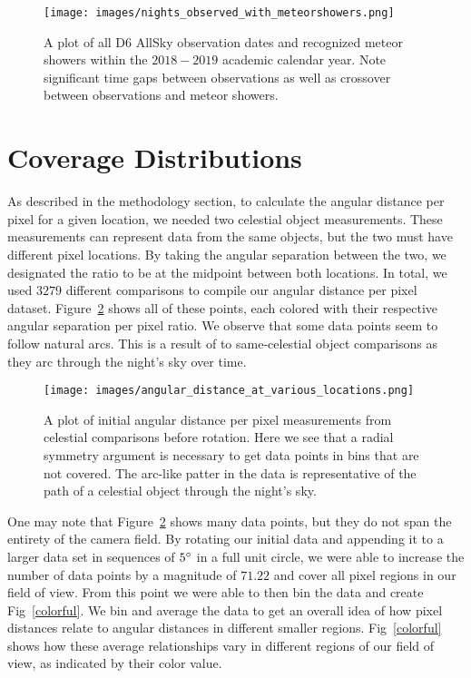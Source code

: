 \begin{figure}[ht!]
  \centering
  \texttt{[image: images/nights\_observed\_with\_meteorshowers.png]}
  \caption[A plot of all D6 AllSky observation dates and recognized meteor showers within the $2018-2019$ academic calendar year.]{A plot of all D6 AllSky observation dates and recognized meteor showers within the $2018-2019$ academic calendar year.  Note significant time gaps between observations as well as crossover between observations and meteor showers.}
  \label{dateplot}
\end{figure}




\section{Coverage Distributions}

As described in the methodology section, to calculate the angular distance per pixel for a given location, we needed two celestial object measurements.
These measurements can represent data from the same objects, but the two must have different pixel locations.
By taking the angular separation between the two, we designated the ratio to be at the midpoint between both locations.  
In total, we used $3279$ different comparisons to compile our angular distance per pixel dataset.  
Figure~\ref{angperpix1} shows all of these points, each colored with their respective angular separation per pixel ratio. 
We observe that some data points seem to follow natural arcs.
This is a result of to same-celestial object comparisons as they arc through the night's sky over time.


\begin{figure}[ht!]
  \centering
  \texttt{[image: images/angular\_distance\_at\_various\_locations.png]}
  \caption[A plot of initial angular distance per pixel measurements from celestial comparisons before rotation.]{A plot of initial angular distance per pixel measurements from celestial comparisons before rotation.  Here we see that a radial symmetry argument is necessary to get data points in bins that are not covered.  The arc-like patter in the data is representative of the path of a celestial object through the night's sky.}
  \label{angperpix1}
\end{figure}

One may note that Figure~\ref{angperpix1} shows many data points, but they do not span the entirety of the camera field. 
By rotating our initial data and appending it to a larger data set in sequences of $5\degree$ in a full unit circle, we were able to increase the number of data points by a magnitude of $71.22$ and cover all pixel regions in our field of view.
From this point we were able to then bin the data and create Fig~\ref{colorful}.
We bin and average the data to get an overall idea of how pixel distances relate to angular distances in different smaller regions.
Fig~\ref{colorful} shows how these average relationships vary in different regions of our field of view, as indicated by their color value.

